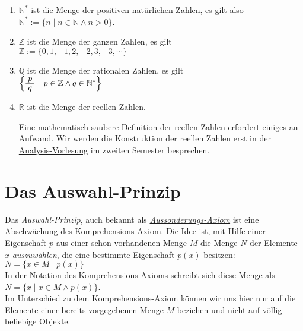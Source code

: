 \begin{enumerate}
\item $\mathbb{N}^*$ ist die Menge der positiven nat\"{u}rlichen Zahlen, es gilt also
      \\[0.2cm]
      \hspace*{1.3cm}
      $\mathbb{N}^* := \{ n \mid n \in \mathbb{N} \wedge n > 0 \}$.
\item $\mathbb{Z}$ ist die Menge der ganzen Zahlen, es gilt
      \\[0.2cm]
      \hspace*{1.3cm}
      $\mathbb{Z} := \{ 0, 1, -1, 2, -2, 3, -3, \cdots \}$ 

\item $\mathbb{Q}$ ist die Menge der rationalen Zahlen, es gilt
      \\[0.2cm]
      \hspace*{1.3cm}
      $\Bigl\{ \bruch{p}{q} \mid\, p \in \mathbb{Z} \wedge q \in \mathbb{N}^* \Bigr\}$
\item $\mathbb{R}$ ist die Menge der reellen Zahlen.

      Eine mathematisch saubere Definition der reellen Zahlen erfordert einiges an Aufwand.  Wir
      werden die Konstruktion der reellen Zahlen erst in der
      \href{https://github.com/karlstroetmann/Analysis/blob/master/Script/analysis.pdf}{Analysis-Vorlesung}
      im zweiten Semester besprechen. 
\end{enumerate}


\section{Das Auswahl-Prinzip}
Das \emph{Auswahl-Prinzip}, auch bekannt als 
\href{https://de.wikipedia.org/wiki/Aussonderungsaxiom}{\emph{Aussonderungs-Axiom}}
 ist eine Abschw\"{a}chung des Komprehensions-Axiom.  Die Idee
ist, mit Hilfe einer Eigenschaft $p$ aus einer schon vorhandenen Menge $M$ die Menge $N$ der 
Elemente $x$ \emph{auszuw\"{a}hlen}, die eine bestimmte Eigenschaft $p(x)$ besitzen: \\[0.2cm]
\hspace*{1.3cm} $N = \{ x\in M \;|\; p(x) \}$ \\[0.2cm]
In der Notation des Komprehensions-Axioms schreibt sich diese Menge als \\[0.2cm]
\hspace*{1.3cm} $N = \{ x \mid x \in M \wedge p(x) \}$. \\[0.2cm]
Im Unterschied zu dem Komprehensions-Axiom k\"{o}nnen wir uns hier nur auf die Elemente einer
bereits vorgegebenen Menge $M$ beziehen und nicht auf v\"{o}llig beliebige Objekte.
\vspace{0.2cm}

